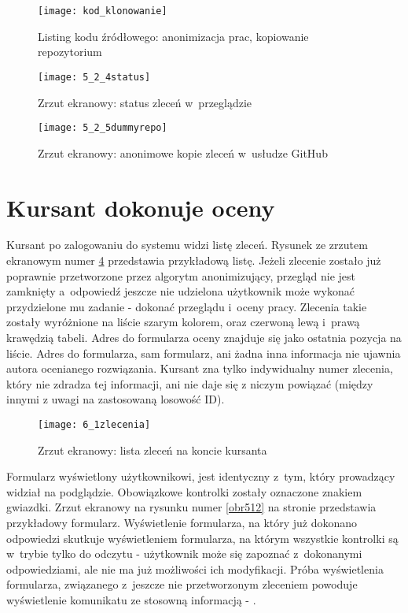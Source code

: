 \begin{figure}[!h]
    \texttt{[image: kod\_klonowanie]}
    \caption{Listing kodu źródłowego: anonimizacja prac, kopiowanie repozytorium}
    \label{kodanon}
\end{figure}


\begin{figure}[!h]
    \texttt{[image: 5\_2\_4status]}
    \caption{Zrzut ekranowy: status zleceń w~przeglądzie}
    \label{obr524}
\end{figure}

\begin{figure}[!h]
    \texttt{[image: 5\_2\_5dummyrepo]}
    \caption{Zrzut ekranowy: anonimowe kopie zleceń w~usłudze GitHub}
    \label{obr525}
\end{figure}

\clearpage
\section{Kursant dokonuje oceny}
Kursant po zalogowaniu do systemu widzi listę zleceń. Rysunek ze zrzutem ekranowym numer \ref{obr61} przedstawia przykładową listę. Jeżeli zlecenie zostało już poprawnie przetworzone przez algorytm anonimizujący, przegląd nie jest zamknięty a~odpowiedź jeszcze nie udzielona użytkownik może wykonać przydzielone mu zadanie - dokonać przeglądu i~oceny pracy. Zlecenia takie zostały wyróżnione na liście szarym kolorem, oraz czerwoną lewą i~prawą krawędzią tabeli. Adres do formularza oceny znajduje się jako ostatnia pozycja na liście. Adres do formularza, sam formularz, ani żadna inna informacja nie ujawnia autora ocenianego rozwiązania. Kursant zna tylko indywidualny numer zlecenia, który nie zdradza tej informacji, ani nie daje się z niczym powiązać (między innymi z uwagi na zastosowaną losowość ID).

\begin{figure}[!h]
    \texttt{[image: 6\_1zlecenia]}
    \caption{Zrzut ekranowy: lista zleceń na koncie kursanta}
    \label{obr61}
\end{figure}

\medskip
Formularz wyświetlony użytkownikowi, jest identyczny z~tym, który prowadzący widział na podglądzie. Obowiązkowe kontrolki zostały oznaczone znakiem gwiazdki. Zrzut ekranowy na rysunku numer \ref{obr512} na stronie \pageref{obr512} przedstawia przykładowy formularz. Wyświetlenie formularza, na który już dokonano odpowiedzi skutkuje wyświetleniem formularza, na którym wszystkie kontrolki są w~trybie tylko do odczytu - użytkownik może się zapoznać z~dokonanymi odpowiedziami, ale nie ma już możliwości ich modyfikacji. Próba wyświetlenia formularza, związanego z~jeszcze nie przetworzonym zleceniem powoduje wyświetlenie komunikatu ze stosowną informacją - .

